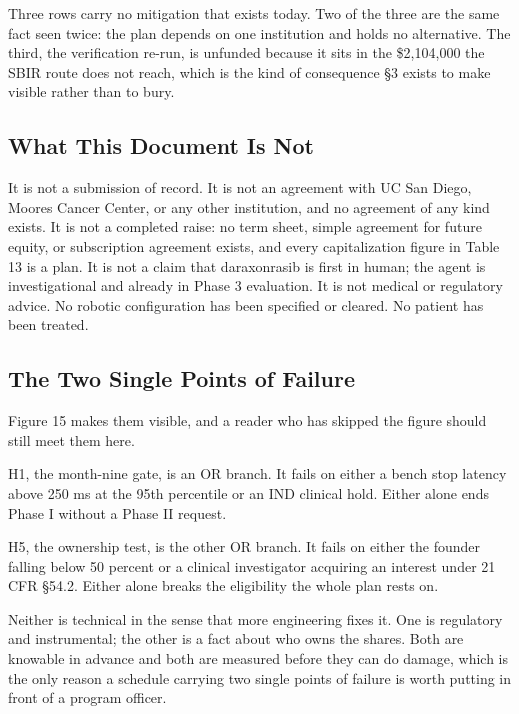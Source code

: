 Three rows carry no mitigation that exists today. Two of the three are the same
fact seen twice: the plan depends on one institution and holds no alternative.
The third, the verification re-run, is unfunded because it sits in the
\$2,104,000 the SBIR route does not reach, which is the kind of consequence \S3
exists to make visible rather than to bury.

\subsection{What This Document Is Not}

It is not a submission of record. It is not an agreement with UC San Diego,
Moores Cancer Center, or any other institution, and no agreement of any kind
exists. It is not a completed raise: no term sheet, simple agreement for future
equity, or subscription agreement exists, and every capitalization figure in
Table 13 is a plan. It is not a claim that daraxonrasib is first in human; the
agent is investigational and already in Phase 3 evaluation. It is not medical or
regulatory advice. No robotic configuration has been specified or cleared. No
patient has been treated.

\subsection{The Two Single Points of Failure}

Figure 15 makes them visible, and a reader who has skipped the figure should
still meet them here.

H1, the month-nine gate, is an OR branch. It fails on either a bench stop
latency above 250 ms at the 95th percentile or an IND clinical hold. Either
alone ends Phase I without a Phase II request.

H5, the ownership test, is the other OR branch. It fails on either the founder
falling below 50 percent or a clinical investigator acquiring an interest under
21 CFR \S54.2. Either alone breaks the eligibility the whole plan rests on.

Neither is technical in the sense that more engineering fixes it. One is
regulatory and instrumental; the other is a fact about who owns the shares. Both
are knowable in advance and both are measured before they can do damage, which
is the only reason a schedule carrying two single points of failure is worth
putting in front of a program officer.

